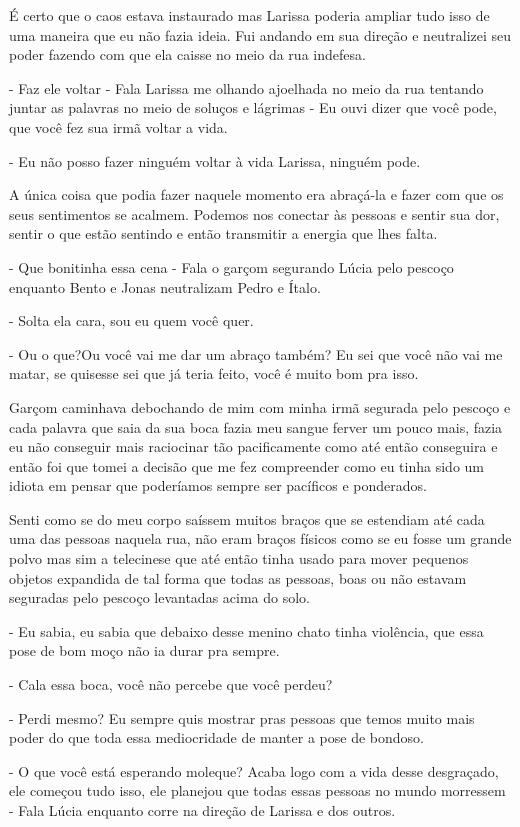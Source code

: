 É certo que o caos estava instaurado mas Larissa poderia ampliar tudo isso de uma maneira que eu não fazia ideia. Fui andando em sua direção e neutralizei seu poder fazendo com que ela caisse no meio da rua indefesa.

- Faz ele voltar - Fala Larissa me olhando ajoelhada no meio da rua tentando juntar as palavras no meio de soluços e lágrimas - Eu ouvi dizer que você pode, que você fez sua irmã voltar a vida.

- Eu não posso fazer ninguém voltar à vida Larissa, ninguém pode.

A única coisa que podia fazer naquele momento era abraçá-la e fazer com que os seus sentimentos se acalmem. Podemos nos conectar às pessoas e sentir sua dor, sentir o que estão sentindo e então transmitir a energia que lhes falta.

- Que bonitinha essa cena - Fala o garçom segurando Lúcia pelo pescoço enquanto Bento e Jonas neutralizam Pedro e Ítalo.

- Solta ela cara, sou eu quem você quer.

- Ou o que?Ou você vai me dar um abraço também? Eu sei que você não vai me matar, se quisesse sei que já teria feito, você é muito bom pra isso.

Garçom caminhava debochando de mim com minha irmã segurada pelo pescoço e cada palavra que saia da sua boca fazia meu sangue ferver um pouco mais, fazia eu não conseguir mais raciocinar tão pacificamente como até então conseguira e então foi que tomei a decisão que me fez compreender como eu tinha sido um idiota em pensar que poderíamos sempre ser pacíficos e ponderados.

Senti como se do meu corpo saíssem muitos braços que se estendiam até cada uma das pessoas naquela rua, não eram braços físicos como se eu fosse um grande polvo mas sim a telecinese que até então tinha usado para mover pequenos objetos expandida de tal forma que todas as pessoas, boas ou não estavam seguradas pelo pescoço levantadas acima do solo.

- Eu sabia, eu sabia que debaixo desse menino chato tinha violência, que essa pose de bom moço não ia durar pra sempre.

- Cala essa boca, você não percebe que você perdeu?

- Perdi mesmo? Eu sempre quis mostrar pras pessoas que temos muito mais poder do que toda essa mediocridade de manter a pose de bondoso.

- O que você está esperando moleque? Acaba logo com a vida desse desgraçado, ele começou tudo isso, ele planejou que todas essas pessoas no mundo morressem - Fala Lúcia enquanto corre na direção de Larissa e dos outros.

